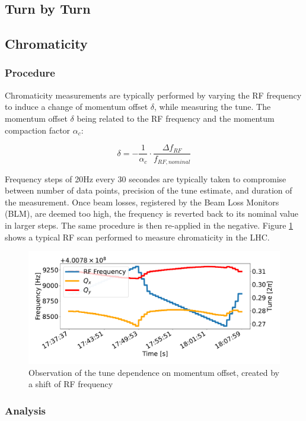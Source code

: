 
\subsection{Turn by Turn}





\subsection{Chromaticity}

\subsubsection{Procedure}

Chromaticity measurements are typically performed by varying the RF frequency to induce a change of momentum offset $\delta$, while measuring the tune.
The momentum offset $\delta$ being related to the RF frequency and the momentum compaction factor $\alpha_c$:

\begin{equation}
    \delta = - \frac{1}{\alpha_c} \cdot \frac{\Delta f_{RF}}{f_{RF,nominal}}
    \label{eq:dpp_rf}
\end{equation}

Frequency steps of 20Hz every 30 secondes are typically taken to compromise between number of data points, precision of the tune estimate, and duration of the measurement.
Once beam losses, registered by the Beam Loss Monitors (BLM), are deemed too high, the frequency is reverted back to its nominal value in larger steps. The same procedure is then re-applied in the negative. Figure \ref{fig:measurements:rf_scan} shows a typical RF scan performed to measure chromaticity in the LHC.

\begin{figure}[H]
    \centering
    \includegraphics[width=1\textwidth]{images/rf_scan.pdf}
    \caption{Observation of the tune dependence on momentum offset, created by a shift of RF frequency}
    \label{fig:measurements:rf_scan}
\end{figure}




\subsubsection{Analysis}
